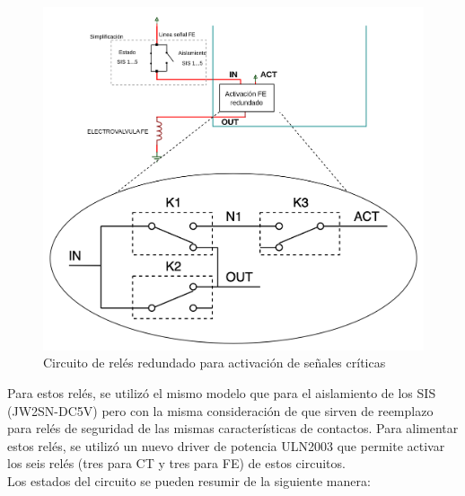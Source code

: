 \begin{figure}[H]
    \centering
    \includegraphics[width = \linewidth]{img/reles_critico.png}
    \caption{Circuito de relés redundado para activación de señales críticas}
    \label{fig:reles_critico}
\end{figure}

Para estos relés, se utilizó el mismo modelo que para el aislamiento de los SIS (JW2SN-DC5V) pero con la misma consideración de que sirven de reemplazo para relés de seguridad de las mismas características de contactos. Para alimentar estos relés, se utilizó un nuevo driver de potencia ULN2003 que permite activar los seis relés (tres para CT y tres para FE) de estos circuitos. \\ 

Los estados del circuito se pueden resumir de la siguiente manera:

